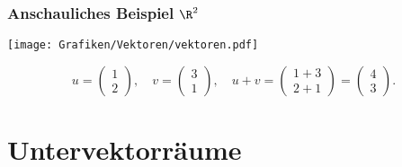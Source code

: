 \begin{frame}\frametitle{Anschauliches Beispiel $\R^2$}

	\begin{center}
		\texttt{[image: Grafiken/Vektoren/vektoren.pdf]}
	\end{center}
	
	$$
		u = 
		\begin{pmatrix}
			1 \\
			2
		\end{pmatrix},
		\quad
		v = 
		\begin{pmatrix}
			3 \\
			1
		\end{pmatrix},	
		\quad
		u+v = 
		\begin{pmatrix}
			1+3 \\
			2+1
		\end{pmatrix}= 
		\begin{pmatrix}
			4 \\
			3
		\end{pmatrix}.				
	$$
	
\end{frame}
\section{Untervektorräume}
\makeSectionDividerPage
